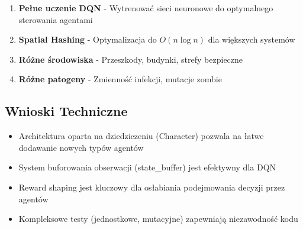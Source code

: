 \documentclass[12pt,a4paper]{article}
\begin{document}
\begin{enumerate}
	\item \textbf{Pełne uczenie DQN} - Wytrenować sieci neuronowe do optymalnego sterowania agentami
	\item \textbf{Spatial Hashing} - Optymalizacja do $O(n \log n)$ dla większych systemów
	\item \textbf{Różne środowiska} - Przeszkody, budynki, strefy bezpieczne
	\item \textbf{Różne patogeny} - Zmienność infekcji, mutacje zombie
\end{enumerate}

\subsection{Wnioski Techniczne}

\begin{itemize}
	\item Architektura oparta na dziedziczeniu (Character) pozwala na łatwe dodawanie
	      nowych typów agentów
	\item System buforowania obserwacji (state\_buffer) jest efektywny dla DQN
	\item Reward shaping jest kluczowy dla osłabiania podejmowania decyzji przez agentów
	\item Kompleksowe testy (jednostkowe, mutacyjne) zapewniają niezawodność kodu
\end{itemize}
\end{document}
